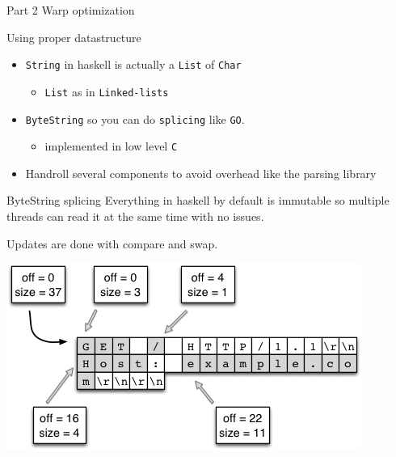 \documentclass[presentation]{beamer}
\begin{document}
\begin{frame}[label={sec:org785492e},fragile]{Part 2 Warp optimization}
\begin{block}{Using proper datastructure}
\begin{itemize}
\item \texttt{String} in haskell is actually a \texttt{List} of \texttt{Char}
\begin{itemize}
\item \texttt{List} as in \texttt{Linked-lists}
\end{itemize}
\item \texttt{ByteString} so you can do \texttt{splicing} like \texttt{GO}.
\begin{itemize}
\item implemented in low level \texttt{C}
\end{itemize}
\item Handroll several components to avoid overhead like the parsing library
\end{itemize}
\end{block}
\begin{block}{ByteString splicing}
Everything in haskell by default is immutable so multiple threads can read it at the same time with no issues.

Updates are done with compare and swap.
\begin{center}
\includegraphics[width=.9\linewidth]{ByteString_splicing/2020-08-20_15-39-39_screenshot.png}
\end{center}
\end{block}
\end{frame}
\end{document}
